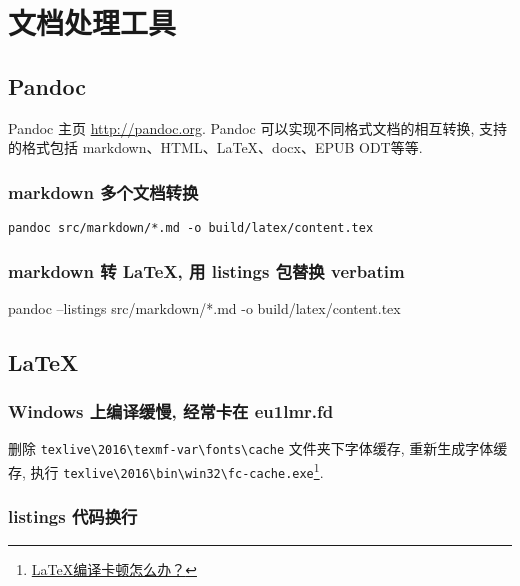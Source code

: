 \section{文档处理工具}\label{ux6587ux6863ux5904ux7406ux5de5ux5177}

\subsection{Pandoc}\label{pandoc}

Pandoc 主页 \url{http://pandoc.org}. Pandoc
可以实现不同格式文档的相互转换, 支持的格式包括
markdown、HTML、LaTeX、docx、EPUB ODT等等.

\subsubsection{markdown
多个文档转换}\label{markdown-ux591aux4e2aux6587ux6863ux8f6cux6362}

\begin{lstlisting}
pandoc src/markdown/*.md -o build/latex/content.tex
\end{lstlisting}

\subsubsection{markdown 转 LaTeX, 用 listings 包替换
verbatim}\label{markdown-ux8f6c-latex-ux7528-listings-ux5305ux66ffux6362-verbatim}

pandoc --listings src/markdown/*.md -o build/latex/content.tex

\subsection{LaTeX}\label{latex}

\subsubsection{Windows 上编译缓慢, 经常卡在
eu1lmr.fd}\label{windows-ux4e0aux7f16ux8bd1ux7f13ux6162-ux7ecfux5e38ux5361ux5728-eu1lmr.fd}

删除 \lstinline!texlive\2016\texmf-var\fonts\cache! 文件夹下字体缓存,
重新生成字体缓存, 执行
\lstinline!texlive\2016\bin\win32\fc-cache.exe!\footnote{\href{https://www.zhihu.com/question/51999238/answer/135852542}{LaTeX编译卡顿怎么办？}}.

\subsubsection{listings
代码换行}\label{listings-ux4ee3ux7801ux6362ux884c}

